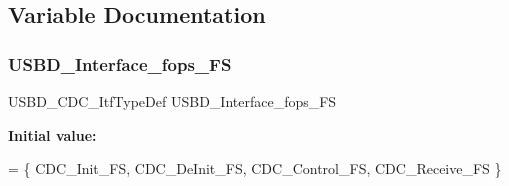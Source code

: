 \subsection{Variable Documentation}
\hypertarget{group___u_s_b_d___c_d_c_ga99394ed19b774f171df96c2848c411ed}{}\label{group___u_s_b_d___c_d_c_ga99394ed19b774f171df96c2848c411ed} 
\subsubsection{\texorpdfstring{U\+S\+B\+D\+\_\+\+Interface\+\_\+fops\+\_\+\+FS}{USBD\_Interface\_fops\_FS}}
{\footnotesize\ttfamily U\+S\+B\+D\+\_\+\+C\+D\+C\+\_\+\+Itf\+Type\+Def U\+S\+B\+D\+\_\+\+Interface\+\_\+fops\+\_\+\+FS}

{\bfseries Initial value\+:}
\begin{DoxyCode}
= 
\{
  CDC\_Init\_FS,
  CDC\_DeInit\_FS,
  CDC\_Control\_FS,  
  CDC\_Receive\_FS
\}
\end{DoxyCode}
